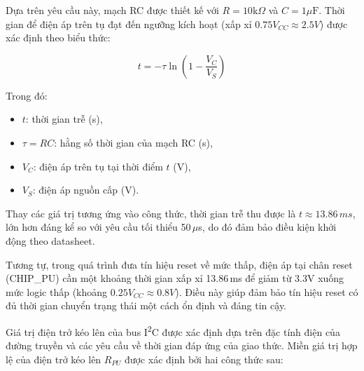             Dựa trên yêu cầu này, mạch RC được thiết kế với $R = 10\text{k}\Omega$ và $C = 1\mu\text{F}$. Thời gian để điện áp trên tụ đạt đến ngưỡng kích hoạt (xấp xỉ $0.75V_{CC} \approx 2.5V$) được xác định theo biểu thức:

            \begin{minipage}{0.45\textwidth}
                \centering
                \begin{equation}
                    t = -\tau \ln \left(1 - \dfrac{V_C}{V_S}\right)
                \end{equation}
            \end{minipage}
            \hfill
            \begin{minipage}{0.45\textwidth}
                Trong đó:
                \begin{itemize}
                    \item $t$: thời gian trễ (s),
                    \item $\tau = RC$: hằng số thời gian của mạch RC (s),
                    \item $V_C$: điện áp trên tụ tại thời điểm $t$ (V),
                    \item $V_S$: điện áp nguồn cấp (V).
                \end{itemize}
            \end{minipage}

            Thay các giá trị tương ứng vào công thức, thời gian trễ thu được là $t \approx 13.86\,ms$, lớn hơn đáng kể so với yêu cầu tối thiểu 50\,$\mu$s, do đó đảm bảo điều kiện khởi động theo datasheet.

            Tương tự, trong quá trình đưa tín hiệu reset về mức thấp, điện áp tại chân reset (CHIP\_PU) cần một khoảng thời gian xấp xỉ 13.86\,ms để giảm từ 3.3V xuống mức logic thấp (khoảng $0.25V_{CC} \approx 0.8V$). Điều này giúp đảm bảo tín hiệu reset có đủ thời gian chuyển trạng thái một cách ổn định và đáng tin cậy.

            Giá trị điện trở kéo lên của bus I\textsuperscript{2}C được xác định dựa trên đặc tính điện của đường truyền và các yêu cầu về thời gian đáp ứng của giao thức. Miền giá trị hợp lệ của điện trở kéo lên \(R_{PU}\) được xác định bởi hai công thức sau:\cite{I2CBusPullupResistorCalculation}
            
